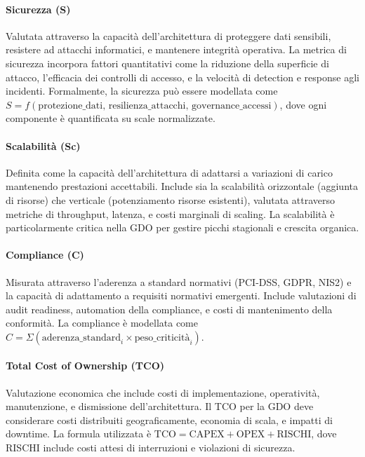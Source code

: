 \documentclass[12pt,a4paper,oneside]{book}
\begin{document}
\paragraph{Sicurezza (S)} Valutata attraverso la capacità dell'architettura di proteggere dati sensibili, resistere ad attacchi informatici, e mantenere integrità operativa. La metrica di sicurezza incorpora fattori quantitativi come la riduzione della superficie di attacco, l'efficacia dei controlli di accesso, e la velocità di detection e response agli incidenti. Formalmente, la sicurezza può essere modellata come $S = f(\text{protezione\_dati, resilienza\_attacchi, governance\_accessi})$, dove ogni componente è quantificata su scale normalizzate.

\paragraph{Scalabilità (Sc)} Definita come la capacità dell'architettura di adattarsi a variazioni di carico mantenendo prestazioni accettabili. Include sia la scalabilità orizzontale (aggiunta di risorse) che verticale (potenziamento risorse esistenti), valutata attraverso metriche di throughput, latenza, e costi marginali di scaling. La scalabilità è particolarmente critica nella GDO per gestire picchi stagionali e crescita organica.

\paragraph{Compliance (C)} Misurata attraverso l'aderenza a standard normativi (PCI-DSS, GDPR, NIS2) e la capacità di adattamento a requisiti normativi emergenti. Include valutazioni di audit readiness, automation della compliance, e costi di mantenimento della conformità. La compliance è modellata come $C = \Sigma(\text{aderenza\_standard}_i \times \text{peso\_criticità}_i)$.

\paragraph{Total Cost of Ownership (TCO)} Valutazione economica che include costi di implementazione, operatività, manutenzione, e dismissione dell'architettura. Il TCO per la GDO deve considerare costi distribuiti geograficamente, economia di scala, e impatti di downtime. La formula utilizzata è $\text{TCO} = \text{CAPEX} + \text{OPEX} + \text{RISCHI}$, dove RISCHI include costi attesi di interruzioni e violazioni di sicurezza.
\end{document}
